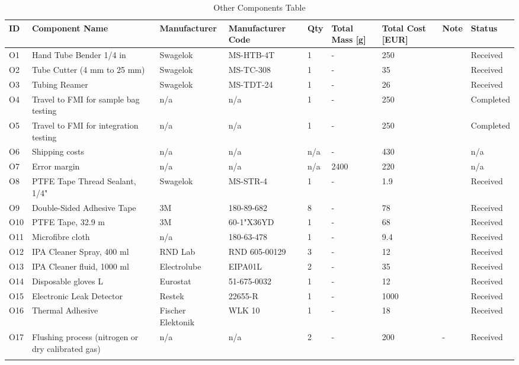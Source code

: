 \begin{longtable} {|m{}|m{}|m{}|m{}|m{}|m{}|m{}|m{}|m{}|} \hline \textbf{ID} & \textbf{Component Name} & \textbf{Manufacturer} & \textbf{Manufacturer Code} & \textbf{Qty} & \textbf{Total Mass [g]} & \textbf{Total Cost [EUR]}  & \textbf{Note}  & \textbf{Status} \\ \hline O1 & Hand Tube Bender 1/4 in & Swagelok & MS-HTB-4T & 1 & - & 250 &  & Received \\ \hline O2 & Tube Cutter (4 mm to 25 mm) & Swagelok & MS-TC-308 & 1 & - & 35 &  & Received \\ \hline O3 & Tubing Reamer & Swagelok & MS-TDT-24 & 1 & - & 26 &  & Received \\ \hline O4 & Travel to FMI for sample bag testing & n/a & n/a & 1 & - & 250 &  & Completed \\ \hline O5 & Travel to FMI for integration testing & n/a & n/a & 1 & - & 250 &  & Completed \\ \hline O6 & Shipping costs & n/a & n/a & n/a & - & 430 &  & n/a \\ \hline O7 & Error margin & n/a & n/a & n/a & 2400 & 220 &  & n/a \\ \hline O8 & PTFE Tape Thread Sealant, 1/4" & Swagelok & MS-STR-4 & 1 & - & 1.9 &  & Received \\ \hline O9 & Double-Sided Adhesive Tape & 3M & 180-89-682 & 8 & - & 78 &  & Received \\ \hline O10 & PTFE Tape, 32.9 m  & 3M & 60-1"X36YD  & 1 & - & 68 &  & Received \\ \hline O11 & Microfibre cloth & n/a & 180-63-478 & 1 & - & 9.4 &  & Received \\ \hline O12 & IPA Cleaner Spray, 400 ml & RND Lab & RND 605-00129 & 3 & - & 12 &  & Received \\ \hline O13 & IPA Cleaner fluid, 1000 ml &  Electrolube  & EIPA01L & 2 & - & 35 &  & Received \\ \hline O14 & Disposable gloves L & Eurostat &         51-675-0032 & 1 & - & 12 &  & Received \\ \hline O15 & Electronic Leak Detector & Restek & 22655-R & 1 & - & 1000 &  & Received \\ \hline O16 & Thermal Adhesive & Fischer Elektonik & WLK 10 & 1 & - & 18 &  & Received \\ \hline O17 & Flushing process (nitrogen or dry calibrated gas) & n/a & n/a & 2 & - & 200 & - & Received \\ \hline \caption{Other Components Table} \label{tab:component-table-other} \end{longtable} \raggedbottom